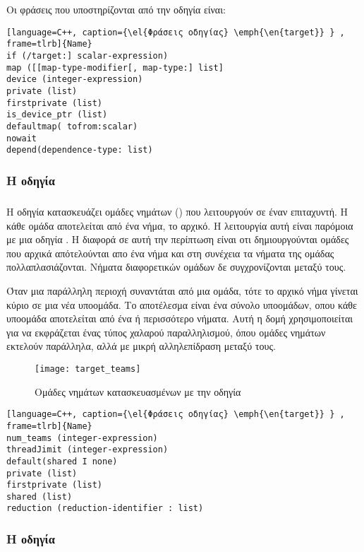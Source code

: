 Οι φράσεις που υποστηρίζονται από την οδηγία είναι:

\begin{lstlisting}[language=C++, caption={\el{Φράσεις οδηγίας} \emph{\en{target}} } , frame=tlrb]{Name}
if (/target:] scalar-expression)
map ([[map-type-modifier[, map-type:] list]
device (integer-expression)
private (list)
firstprivate (list)
is_device_ptr (list)
defaultmap( tofrom:scalar)
nowait
depend(dependence-type: list)
\end{lstlisting}

\subsubsection{Η οδηγία }
\subparagraph{}
Η οδηγία \emph{} κατασκευάζει ομάδες νημάτων (\emph{}) που λειτουργούν σε έναν επιταχυντή. Η κάθε ομάδα αποτελείται από ένα νήμα, το αρχικό. Η λειτουργία αυτή είναι παρόμοια με μια οδηγία \emph{}. H διαφορά σε αυτή την περίπτωση είναι οτι δημιουργούνται ομάδες που αρχικά απότελούνται απο ένα νήμα και στη συνέχεια τα νήματα της ομάδας πολλαπλασιάζονται. Νήματα διαφορετικών ομάδων δε συγχρονίζονται μεταξύ τους.

Όταν μια παράλληλη περιοχή συναντάται από μια ομάδα, τότε το αρχικό νήμα γίνεται κύριο σε μια νέα υποομάδα. Το αποτέλεσμα είναι ένα σύνολο υποομάδων, οπου κάθε υποομάδα αποτελείται από ένα ή περισσότερο νήματα. Αυτή η δομή χρησιμοποιείται για να εκφράζεται ένας τύπος χαλαρού παραλληλισμού, όπου ομάδες νημάτων εκτελούν παράλληλα, αλλά με μικρή αλληλεπίδραση μεταξύ τους.

\begin{figure}[h]
\texttt{[image: target\_teams]}
\centering
\captionsetup{justification=centering, singlelinecheck=false}
	\caption{Ομάδες νημάτων κατασκευασμένων με την οδηγία \emph{}}
\label{fig:target_teams}
\end{figure}


\begin{lstlisting}[language=C++, caption={\el{Φράσεις οδηγίας} \emph{\en{target}} } , frame=tlrb]{Name}
num_teams (integer-expression)
threadJimit (integer-expression)
default(shared I none)
private (list)
firstprivate (list)
shared (list)
reduction (reduction-identifier : list)
\end{lstlisting}
\clearpage
\subsubsection{Η οδηγία }
\subparagraph{}


